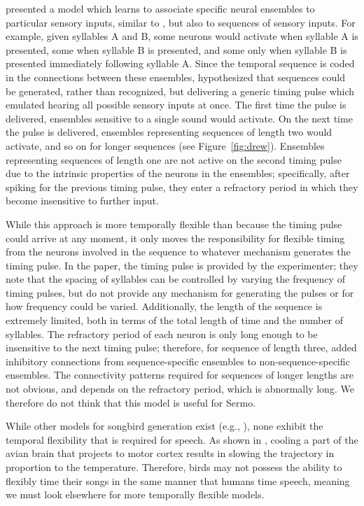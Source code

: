 \citet{drew2003} presented a model
which learns to associate specific neural ensembles
to particular sensory inputs,
similar to \citet{troyer2000},
but also to sequences of sensory inputs.
For example, given syllables A and B,
some neurons would activate
when syllable A is presented,
some when syllable B is presented,
and some only when syllable B is presented
immediately following syllable A.
Since the temporal sequence is
coded in the connections between
these ensembles,
\citeauthor{drew2003} hypothesized that
sequences could be generated,
rather than recognized,
but delivering a generic timing pulse
which emulated hearing all possible sensory
inputs at once.
The first time the pulse is delivered,
ensembles sensitive to a single sound
would activate.
On the next time the pulse is delivered,
ensembles representing sequences of length two
would activate, and so on for longer sequences
(see Figure~\ref{fig:drew}).
Ensembles representing sequences of length one
are not active on the second timing pulse
due to the intrinsic properties
of the neurons in the ensembles;
specifically, after spiking
for the previous timing pulse,
they enter a refractory period
in which they become insensitive to further input.


While this approach is more temporally flexible
than \citet{troyer2000} because
the timing pulse could arrive at any moment,
it only moves the responsibility for flexible timing
from the neurons involved in the sequence
to whatever mechanism generates the timing pulse.
In the paper, the timing pulse is provided
by the experimenter;
they note that the spacing of syllables
can be controlled by varying the frequency
of timing pulses,
but do not provide any mechanism
for generating the pulses
or for how frequency could be varied.
Additionally, the length of the sequence
is extremely limited,
both in terms of the total length of time
and the number of syllables.
The refractory period of each neuron
is only long enough to be insensitive
to the next timing pulse;
therefore, for sequence of length three,
\citeauthor{drew2003} added inhibitory connections
from sequence-specific ensembles
to non-sequence-specific ensembles.
The connectivity patterns required
for sequences of longer lengths
are not obvious,
and depends on the refractory period,
which is abnormally long.
We therefore do not think that
this model is useful for Sermo.

While other models for songbird generation exist
(e.g., \citealt{fee2004}),
none exhibit the temporal flexibility
that is required for speech.
As shown in \citet{fee2010},
cooling a part of the avian brain
that projects to motor cortex
results in slowing the trajectory
in proportion to the temperature.
Therefore, birds may not possess
the ability to flexibly time their songs
in the same manner that humans time speech,
meaning we must look elsewhere for
more temporally flexible models.

